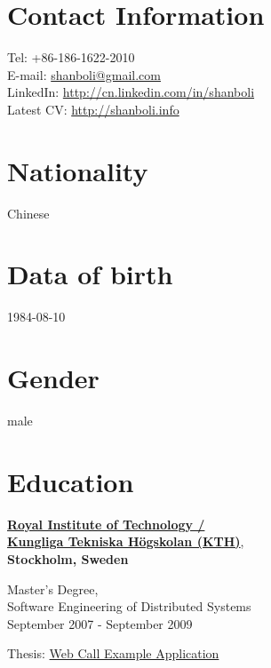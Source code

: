 
\section{Contact Information}
%
%
%
\newlength{\rcollength}\setlength{\rcollength}{3.2in}%
%
Tel: \textsf{+86-186-1622-2010} \\
E-mail: \href{mailto:shanboli@gmail.com}{shanboli@gmail.com}\\
LinkedIn: \href{http://cn.linkedin.com/in/shanboli}{http://cn.linkedin.com/in/shanboli}\\
Latest CV:
\href{http://shanboli.info/}{http://shanboli.info}

\section{Nationality}
%
Chinese

\section{Data of birth}
%
1984-08-10

\section{Gender}
%
male

\section{Education}
%
\href{http://www.kth.se/}{\textbf{Royal Institute of Technology /\\ Kungliga Tekniska H\"{o}gskolan (KTH)}},\\ 
\textbf{Stockholm, Sweden}
\begin{outerlist}
\item[] Master's Degree,\\ 
        {Software Engineering of Distributed Systems} \\
        September 2007 - September 2009
\item[] Thesis: \href{http://shanbohomepage.googlecode.com/hg/master_thesis/master_thesis.pdf}{Web Call Example Application}
\end{outerlist}
\blankline

